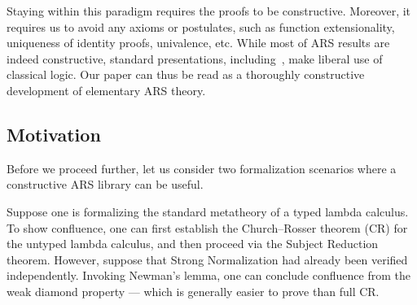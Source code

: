 Staying within this paradigm requires the proofs to be constructive.
Moreover, it requires us to avoid any axioms or postulates, such as function
extensionality, uniqueness of identity proofs, univalence, etc.
While most of ARS results are indeed constructive, standard presentations,
 including~\cite{Terese}, make liberal use of classical logic.
Our paper can thus be read as a thoroughly constructive
development of elementary ARS theory.

\subsection{Motivation}

Before we proceed further, let us consider two formalization scenarios where
a constructive ARS library can be useful.

\begin{example}
Suppose one is formalizing the standard metatheory of
a typed lambda calculus.  To show confluence, one can
first establish the Church--Rosser theorem (CR) for the untyped lambda calculus,
and then proceed via the Subject Reduction theorem.
However, suppose that Strong Normalization had already been verified independently.
Invoking Newman's lemma, one can conclude confluence from the weak
diamond property --- which is generally easier to prove than full CR.
\end{example}

